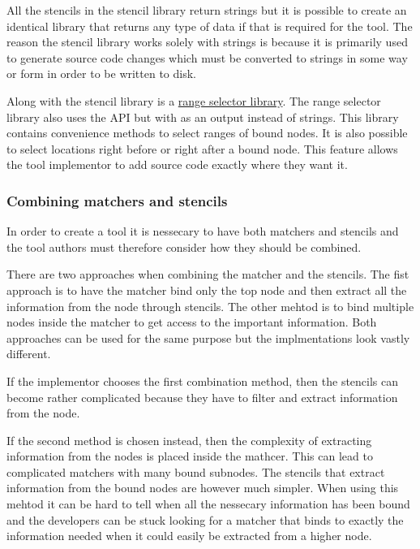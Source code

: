 All the stencils in the stencil library return strings but it is possible to create an identical library that returns any type of data if that is required for the tool. The reason the stencil library works solely with strings is because it is primarily used to generate source code changes which must be converted to strings in some way or form in order to be written to disk. 

Along with the stencil library is a \href{https://github.com/llvm/llvm-project/blob/main/clang/include/clang/Tooling/Transformer/RangeSelector.h}{range selector library}. The range selector library also uses the  API but with  as an output instead of strings. This library contains convenience methods to select ranges of bound nodes. It is also possible to select locations right before or right after a bound node. This feature allows the tool implementor to add source code exactly where they want it.

\subsubsection*{Combining matchers and stencils}

In order to create a tool it is nessecary to have both matchers and stencils and the tool authors must therefore consider how they should be combined.

There are two approaches when combining the matcher and the stencils. The fist approach is to have the matcher bind only the top node and then extract all the information from the node through stencils. The other mehtod is to bind multiple nodes inside the matcher to get access to the important information. Both approaches can be used for the same purpose but the implmentations look vastly different.
 
If the implementor chooses the first combination method, then the stencils can become rather complicated because they have to filter and extract information from the node. 

If the second method is chosen instead, then the complexity of extracting information from the nodes is placed inside the mathcer. This can lead to complicated matchers with many bound subnodes. The stencils that extract information from the bound nodes are however much simpler. When using this mehtod it can be hard to tell when all the nessecary information has been bound and the developers can be stuck looking for a matcher that binds to exactly the information needed when it could easily be extracted from a higher node.

